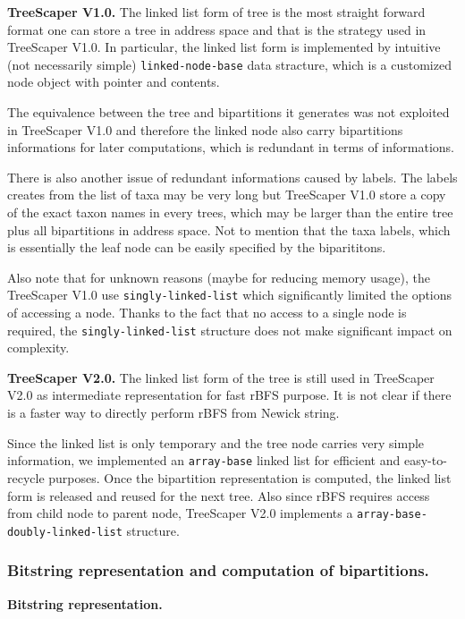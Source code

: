\documentclass[11pt]{article}
\theoremstyle{definition}
\theoremstyle{remark}
\theoremstyle{plain}
\begin{document}
\noindent\textbf{TreeScaper V1.0.} The linked list form of tree is the most straight forward format one can store a tree in address space and that is the strategy used in TreeScaper V1.0. In particular, the linked list form is implemented by intuitive (not necessarily simple) \texttt{linked-node-base} data stracture, which is a customized node object with pointer and contents. 

The equivalence between the tree and bipartitions it generates was not exploited in TreeScaper V1.0 and therefore the linked node also carry bipartitions informations for later computations, which is redundant in terms of informations. 

There is also another issue of redundant informations caused by labels. The labels creates from the list of taxa may be very long but TreeScaper V1.0 store a copy of the exact taxon names in every trees, which may be larger than the entire tree plus all bipartitions in address space. Not to mention that the taxa labels, which is essentially the leaf node can be easily specified by the biparititons.

Also note that for unknown reasons (maybe for reducing memory usage), the TreeScaper V1.0 use \texttt{singly-linked-list} which significantly limited the options of accessing a node. Thanks to the fact that no access to a single node is required, the \texttt{singly-linked-list} structure does not make significant impact on complexity.

\noindent\textbf{TreeScaper V2.0.} The linked list form of the tree is still used in TreeScaper V2.0 as intermediate representation for fast rBFS purpose. It is not clear if there is a faster way to directly perform rBFS from Newick string.

Since the linked list is only temporary and the tree node carries very simple information, we implemented an \texttt{array-base} linked list for efficient and easy-to-recycle purposes. Once the bipartition representation is computed, the linked list form is released and reused for the next tree. Also since rBFS requires access from child node to parent node, TreeScaper V2.0 implements a \texttt{array-base-doubly-linked-list} structure.

\subsubsection{Bitstring representation and computation of bipartitions.}

\noindent\textbf{Bitstring representation.}
\end{document}
